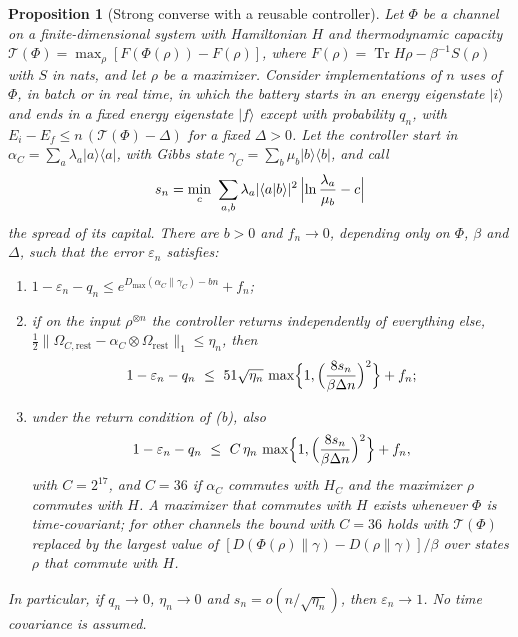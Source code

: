 \documentclass[11pt]{article}
\newtheorem{proposition}[theorem]{Proposition}
\theoremstyle{definition}
\theoremstyle{remark}
\newcommand{\Tr}{\operatorname{Tr}}
\begin{document}
\begin{proposition}[Strong converse with a reusable controller]\label{prop:capital-converse}
Let $\Phi$ be a channel on a finite-dimensional system with Hamiltonian $H$ and thermodynamic capacity $\mathcal T(\Phi)=\max_\rho[F(\Phi(\rho))-F(\rho)]$, where $F(\rho)=\Tr H\rho-\beta^{-1}S(\rho)$ with $S$ in nats, and let $\rho$ be a maximizer. Consider implementations of $n$ uses of $\Phi$, in batch or in real time, in which the battery starts in an energy eigenstate $|i\rangle$ and ends in a fixed energy eigenstate $|f\rangle$ except with probability $q_n$, with $E_i-E_f\le n\,(\mathcal T(\Phi)-\Delta)$ for a fixed $\Delta>0$. Let the controller start in $\alpha_C=\sum_a\lambda_a|a\rangle\langle a|$, with Gibbs state $\gamma_C=\sum_b\mu_b|b\rangle\langle b|$, and call
\[
s_n=\min_c\ \sum_{a,b}\lambda_a|\langle a|b\rangle|^2\,\Bigl|\ln\frac{\lambda_a}{\mu_b}-c\Bigr|
\]
the spread of its capital. There are $b>0$ and $f_n\to0$, depending only on $\Phi$, $\beta$ and $\Delta$, such that the error $\varepsilon_n$ satisfies:
\begin{enumerate}
\item[(a)] $1-\varepsilon_n-q_n\le e^{D_{\max}(\alpha_C\|\gamma_C)-bn}+f_n$;
\item[(b)] if on the input $\rho^{\otimes n}$ the controller returns independently of everything else, $\tfrac12\|\Omega_{C,\mathrm{rest}}-\alpha_C\otimes\Omega_{\mathrm{rest}}\|_1\le\eta_n$, then
\[
1-\varepsilon_n-q_n\ \le\ 51\sqrt{\eta_n}\,\max\Bigl\{1,\Bigl(\frac{8s_n}{\beta\Delta n}\Bigr)^2\Bigr\}+f_n;
\]
\item[(c)] under the return condition of (b), also
\[
1-\varepsilon_n-q_n\ \le\ C\,\eta_n\,\max\Bigl\{1,\Bigl(\frac{8s_n}{\beta\Delta n}\Bigr)^2\Bigr\}+f_n,
\]
with $C=2^{17}$, and $C=36$ if $\alpha_C$ commutes with $H_C$ and the maximizer $\rho$ commutes with $H$. A maximizer that commutes with $H$ exists whenever $\Phi$ is time-covariant; for other channels the bound with $C=36$ holds with $\mathcal T(\Phi)$ replaced by the largest value of $[D(\Phi(\rho)\|\gamma)-D(\rho\|\gamma)]/\beta$ over states $\rho$ that commute with $H$.
\end{enumerate}
In particular, if $q_n\to0$, $\eta_n\to0$ and $s_n=o(n/\sqrt{\eta_n})$, then $\varepsilon_n\to1$. No time covariance is assumed.
\end{proposition}
\end{document}

